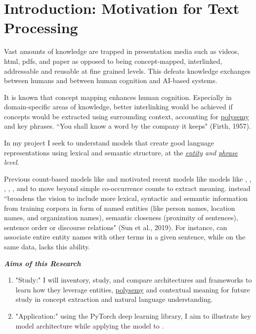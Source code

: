 \section{Introduction: Motivation for Text Processing} \label{sec:Introduction} 

Vast amounts of knowledge are trapped in presentation media such as videos, html, pdfs, and paper as opposed to being concept-mapped, interlinked, addressable and reusable at fine grained levels. This defeats knowledge exchanges between humans and between human cognition and AI-based systems.

It is known that concept mapping enhances human cognition. Especially in domain-specific areas of knowledge, better interlinking would be achieved if concepts would be extracted using surrounding context, accounting for \hyperref[sec:Polysemy]{polysemy} and key phrases. ``You shall know a word by the company it keeps" (Firth, 1957). 

In my project I seek to understand models that create good language representations using lexical and semantic structure, at the \emph{\hyperref[nlptask:namedentityrecognitionNER]{entity} and \hyperref[nlptask:keyphraseextraction]{phrase} level}. 

Previous count-based models like  and  motivated recent models like models like , , , , , and  to move beyond simple co-occurrence counts to extract meaning.  instead ``broadens the vision to include more lexical, syntactic and semantic information from training corpora in form of named entities (like person names, location names, and organization names), semantic closeness (proximity of sentences), sentence order or discourse relations" (Sun et al., 2019). For instance,  can associate entire entity names with other terms in a given sentence, while on the same data,  lacks this ability.

\emph{\textbf{Aims of this Research}}
\vspace{-7pt}
\begin{enumerate}
    \item "Study:" I will inventory, study, and compare architectures and frameworks to learn how they leverage entities,  \hyperref[sec:Polysemy]{polysemy} and contextual meaning for future study in concept extraction and natural language understanding.
    
    \item "Application:" using the PyTorch deep learning library, I aim to illustrate key model architecture while applying the model  to .
\end{enumerate}
 
